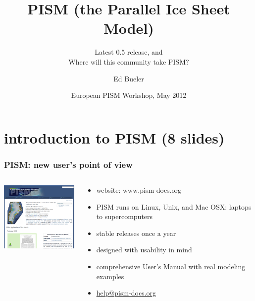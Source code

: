 \documentclass[hide notes,intlimits]{beamer}
\title[PISM (the Parallel Ice Sheet Model)] %
{PISM (the Parallel Ice Sheet Model)}
\subtitle{Latest 0.5 release, and \\ Where will this community take PISM?}
\author[Bueler]{Ed Bueler}
\institute{
University of Alaska Fairbanks
}
\date{European PISM Workshop, May 2012}
\begin{document}


{
} 

\begin{frame}
  \titlepage
\end{frame}

{
}

\section[introduction]{introduction to PISM (8 slides)}

\begin{frame}
  \frametitle{PISM: new user's point of view}
  \begin{columns}
    \begin{column}{50mm}
      \includegraphics[width=50mm]{pismdocs.png}
    \end{column}
    \begin{column}{70mm}
      \begin{itemize}
      \item website: \alert{www.pism-docs.org}
      \item PISM runs on Linux, Unix, and Mac OSX: laptops to supercomputers
      \item stable releases once a year
      \item designed with usability in mind
      \item comprehensive User's Manual with real modeling examples
      \item \url{help@pism-docs.org}
      \end{itemize}
    \end{column}
  \end{columns}
\end{frame}
\end{document}
